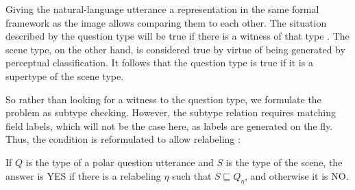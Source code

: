 Giving the natural-language utterance a representation in the same formal framework as the image allows comparing them to each other.
The situation described by the question type will be true if there is a witness of that type \citep{BarwiseSituationsAttitudes1981,CooperAustiniantruthattitudes2005}.
The scene type, on the other hand, is considered true by virtue of being generated by perceptual classification.
It follows that the question type is true if it is a supertype of the scene type.

So rather than looking for a witness to the question type, we formulate the problem as subtype checking.
However, the subtype relation requires matching field labels, which will not be the case here, as labels are generated on the fly.
Thus, the condition is reformulated to allow relabeling \citep[pp. 133–135]{CooperTypetheorylanguage2016}:

If $Q$ is the type of a polar question utterance and $S$ is the type of the scene, the answer is YES if there is a relabeling $\eta$ such that $S \sqsubseteq Q_\eta$, and otherwise it is NO.


